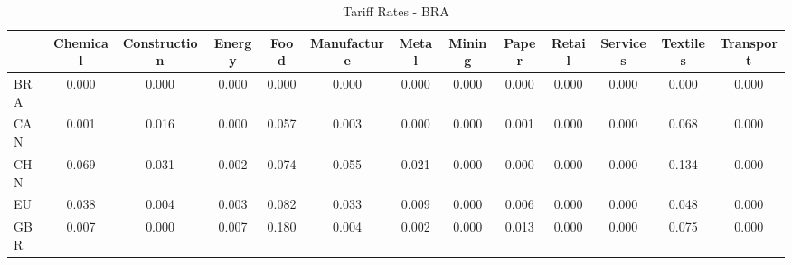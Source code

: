 \begin{table}[htbp]
\centering
\caption{Tariff Rates - BRA} 
\label{tab:tariffs_BRA}
\begin{tabular}{lcccccccccccc}
  \hline
 & Chemical & Construction & Energy & Food & Manufacture & Metal & Mining & Paper & Retail & Services & Textiles & Transport \\ 
  \hline
BRA & \textcolor[RGB]{255,165,0}{0.000} & \textcolor[RGB]{255,165,0}{0.000} & \textcolor[RGB]{255,165,0}{0.000} & \textcolor[RGB]{255,165,0}{0.000} & \textcolor[RGB]{255,165,0}{0.000} & \textcolor[RGB]{255,165,0}{0.000} & \textcolor[RGB]{255,165,0}{0.000} & \textcolor[RGB]{255,165,0}{0.000} & \textcolor[RGB]{255,165,0}{0.000} & \textcolor[RGB]{255,165,0}{0.000} & \textcolor[RGB]{255,165,0}{0.000} & \textcolor[RGB]{255,165,0}{0.000} \\ 
  CAN & \textcolor[RGB]{142,92,113}{0.001} & \textcolor[RGB]{98,63,157}{0.016} & \textcolor[RGB]{255,165,0}{0.000} & \textcolor[RGB]{51,33,204}{0.057} & \textcolor[RGB]{125,81,130}{0.003} & \textcolor[RGB]{147,95,108}{0.000} & \textcolor[RGB]{255,165,0}{0.000} & \textcolor[RGB]{136,88,119}{0.001} & \textcolor[RGB]{255,165,0}{0.000} & \textcolor[RGB]{255,165,0}{0.000} & \textcolor[RGB]{40,26,215}{0.068} & \textcolor[RGB]{255,165,0}{0.000} \\ 
  CHN & \textcolor[RGB]{36,23,219}{0.069} & \textcolor[RGB]{83,54,172}{0.031} & \textcolor[RGB]{132,85,123}{0.002} & \textcolor[RGB]{32,21,223}{0.074} & \textcolor[RGB]{53,34,202}{0.055} & \textcolor[RGB]{94,61,162}{0.021} & \textcolor[RGB]{255,165,0}{0.000} & \textcolor[RGB]{149,96,106}{0.000} & \textcolor[RGB]{255,165,0}{0.000} & \textcolor[RGB]{255,165,0}{0.000} & \textcolor[RGB]{11,7,244}{0.134} & \textcolor[RGB]{255,165,0}{0.000} \\ 
  EU & \textcolor[RGB]{72,47,183}{0.038} & \textcolor[RGB]{121,78,134}{0.004} & \textcolor[RGB]{125,81,130}{0.003} & \textcolor[RGB]{25,16,230}{0.082} & \textcolor[RGB]{81,52,174}{0.033} & \textcolor[RGB]{108,70,147}{0.009} & \textcolor[RGB]{255,165,0}{0.000} & \textcolor[RGB]{117,76,138}{0.006} & \textcolor[RGB]{255,165,0}{0.000} & \textcolor[RGB]{255,165,0}{0.000} & \textcolor[RGB]{57,37,198}{0.048} & \textcolor[RGB]{255,165,0}{0.000} \\ 
  GBR & \textcolor[RGB]{113,73,142}{0.007} & \textcolor[RGB]{255,165,0}{0.000} & \textcolor[RGB]{113,73,142}{0.007} & \textcolor[RGB]{4,3,251}{0.180} & \textcolor[RGB]{119,77,136}{0.004} & \textcolor[RGB]{130,84,125}{0.002} & \textcolor[RGB]{255,165,0}{0.000} & \textcolor[RGB]{106,69,149}{0.013} & \textcolor[RGB]{255,165,0}{0.000} & \textcolor[RGB]{255,165,0}{0.000} & \textcolor[RGB]{30,19,225}{0.075} & \textcolor[RGB]{255,165,0}{0.000} \\ 

\end{tabular}
\end{table}
